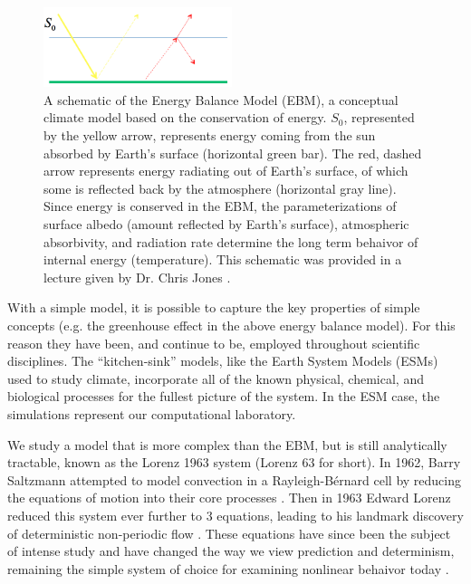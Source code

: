 \documentclass[12pt]{report}
\begin{document}
\begin{figure}[t!]
  \centering
  \includegraphics[width=0.49\textwidth]{figures/Energy-Balance-Model-Schematic.png}
  \caption[A schematic of the Energy Balance Model (EBM), a conceptual climate model based on the conservation of energy]{
    A schematic of the Energy Balance Model (EBM), a conceptual climate model based on the conservation of energy.
    $S_0$, represented by the yellow arrow, represents energy coming from the sun absorbed by Earth's surface (horizontal green bar).
    The red, dashed arrow represents energy radiating out of Earth's surface, of which some is reflected back by the atmosphere (horizontal gray line).
    Since energy is conserved in the EBM, the parameterizations of surface albedo (amount reflected by Earth's surface), atmospheric absorbivity, and radiation rate determine the long term behaivor of internal energy (temperature).
    This schematic was provided in a lecture given by Dr. Chris Jones {\protect {}}.
  }
  \label{fig:EBM}
\end{figure}

With a simple model, it is possible to capture the key properties of simple concepts (e.g. the greenhouse effect in the above energy balance model).
For this reason they have been, and continue to be, employed throughout scientific disciplines.
The ``kitchen-sink'' models, like the Earth System Models (ESMs) used to study climate, incorporate all of the known physical, chemical, and biological processes for the fullest picture of the system.
In the ESM case, the simulations represent our computational laboratory.

We study a model that is more complex than the EBM, but is still analytically tractable, known as the Lorenz 1963 system (Lorenz 63 for short).
In 1962, Barry Saltzmann attempted to model convection in a Rayleigh-B\'{e}rnard cell  by reducing the equations of motion into their core processes .
Then in 1963 Edward Lorenz reduced this system ever further to 3 equations, leading to his landmark discovery of deterministic non-periodic flow .
These equations have since been the subject of intense study and have changed the way we view prediction and determinism, remaining the simple system of choice for examining nonlinear behaivor today \cite{kalnay20074}.
\end{document}
